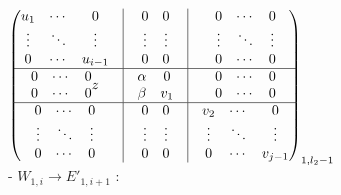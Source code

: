 $
\begin{pmatrix}
		\begin{matrix} 
			u_{1} & \cdots & 0 \\ 
			\vdots & \ddots & \vdots\\
			0 & \cdots & u_{i-1}
		\end{matrix} & \vline &
		\begin{matrix}
			0&0\\
			\vdots&\vdots\\
			0&0
		\end{matrix}& \vline &
		\begin{matrix} 
			0 & \cdots & 0 \\ 
			\vdots & \ddots & \vdots\\
			0 & \cdots & 0
		\end{matrix}\\
		\hline
		\begin{matrix}
			0&\cdots&0\\
			0&\cdots&0
		\end{matrix}z
		& \vline &
		\begin{matrix}
			\alpha & 0\\
			\beta & v_1
		\end{matrix} & \vline&
		\begin{matrix}
			0&\cdots&0\\
			0&\cdots&0
		\end{matrix}\\
		\hline
		\begin{matrix} 
			0 & \cdots & 0 \\ 
			\vdots & \ddots & \vdots\\
			0 & \cdots & 0
		\end{matrix} & \vline &
		\begin{matrix}
			0&0\\
			\vdots&\vdots\\
			0&0
		\end{matrix}& \vline &
		\begin{matrix} 
			v_2 & \cdots & 0 \\ 
			\vdots & \ddots & \vdots\\
			0 & \cdots & v_{j-1}
		\end{matrix}
		
\end{pmatrix}_{1,l_2 -1}
$\\
- $W_{1,i}\rightarrow E'_{1,i+1}$ : 


